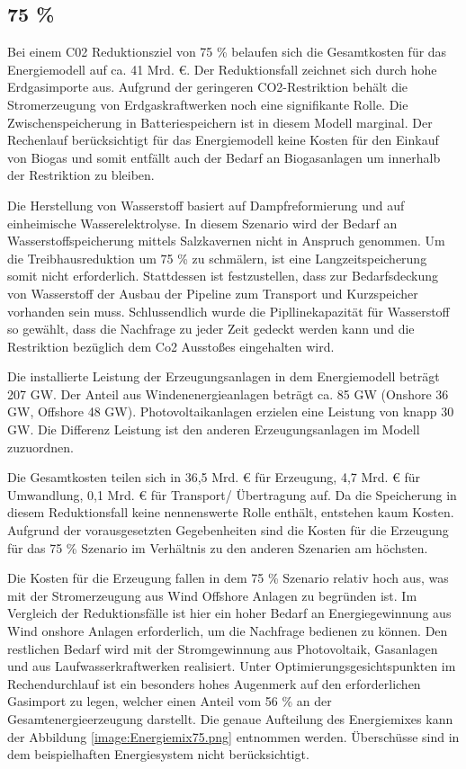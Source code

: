 \subsection{75 \%}
Bei einem C02 Reduktionsziel von 75 \% belaufen sich die Gesamtkosten für das Energiemodell auf ca. 41 Mrd. €. Der Reduktionsfall zeichnet sich durch hohe Erdgasimporte aus. Aufgrund der geringeren CO2-Restriktion behält die Stromerzeugung von Erdgaskraftwerken noch eine signifikante Rolle. Die Zwischenspeicherung in Batteriespeichern ist in diesem Modell marginal. Der Rechenlauf berücksichtigt für das Energiemodell keine Kosten für den Einkauf von Biogas und somit entfällt auch der Bedarf an Biogasanlagen um innerhalb der Restriktion zu bleiben. 

Die Herstellung von Wasserstoff basiert auf Dampfreformierung und auf einheimische Wasserelektrolyse. In diesem Szenario wird der Bedarf an Wasserstoffspeicherung mittels Salzkavernen nicht in Anspruch genommen. Um die Treibhausreduktion um 75 \% zu schmälern, ist eine Langzeitspeicherung somit nicht erforderlich. Stattdessen ist festzustellen, dass zur Bedarfsdeckung von Wasserstoff der Ausbau der Pipeline zum Transport und Kurzspeicher vorhanden sein muss. Schlussendlich wurde die Pipllinekapazität für Wasserstoff so gewählt, dass die Nachfrage zu jeder Zeit gedeckt werden kann und die Restriktion bezüglich dem Co2 Ausstoßes eingehalten wird. 

Die installierte Leistung der Erzeugungsanlagen in dem Energiemodell beträgt 207 GW.  Der Anteil aus Windenenergieanlagen beträgt ca. 85 GW (Onshore 36 GW, Offshore 48 GW). Photovoltaikanlagen erzielen eine Leistung von knapp 30 GW. Die Differenz Leistung ist den anderen Erzeugungsanlagen im Modell zuzuordnen. 

Die Gesamtkosten teilen sich in 36,5 Mrd. € für Erzeugung, 4,7 Mrd. € für Umwandlung, 0,1 Mrd. € für Transport/ Übertragung auf. Da die Speicherung in diesem Reduktionsfall keine nennenswerte Rolle enthält, entstehen kaum Kosten. Aufgrund der vorausgesetzten Gegebenheiten sind die Kosten für die Erzeugung für das 75 \% Szenario im Verhältnis zu den anderen Szenarien am höchsten. 

Die Kosten für die Erzeugung fallen in dem 75 \% Szenario relativ hoch aus, was mit der Stromerzeugung aus Wind Offshore Anlagen zu begründen ist. Im Vergleich der Reduktionsfälle ist hier ein hoher Bedarf an Energiegewinnung aus Wind onshore Anlagen erforderlich, um die Nachfrage bedienen zu können. Den restlichen Bedarf wird mit der Stromgewinnung aus Photovoltaik, Gasanlagen und aus Laufwasserkraftwerken realisiert. Unter Optimierungsgesichtspunkten im Rechendurchlauf ist ein besonders hohes Augenmerk auf den erforderlichen Gasimport zu legen, welcher einen Anteil vom 56 \% an der Gesamtenergieerzeugung darstellt. Die genaue Aufteilung des Energiemixes kann der Abbildung \ref{image:Energiemix75.png} entnommen werden. Überschüsse sind in dem beispielhaften Energiesystem nicht berücksichtigt.
 

